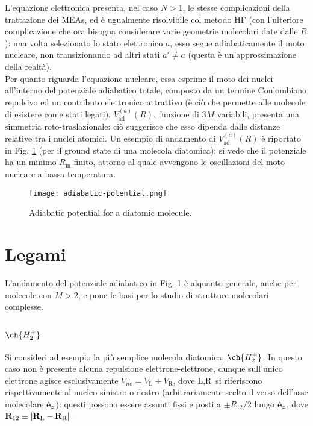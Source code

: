 L'equazione elettronica presenta, nel caso $ N > 1 $, le stesse complicazioni della trattazione dei MEAs, ed è ugualmente risolvibile col metodo HF (con l'ulteriore complicazione che ora bisogna considerare varie geometrie molecolari date dalle $ R $): una volta selezionato lo stato elettronico $ a $, esso segue adiabaticamente il moto nucleare, non transizionando ad altri stati $ a' \neq a $ (questa è un'approssimazione della realtà). \\
Per quanto riguarda l'equazione nucleare, essa esprime il moto dei nuclei all'interno del potenziale adiabatico totale, composto da un termine Coulombiano repulsivo ed un contributo elettronico attrattivo (è ciò che permette alle molecole di esistere come stati legati). $ V_\text{ad}^{(a)}(R) $, funzione di $ 3M $ variabili, presenta una simmetria roto-traslazionale: ciò suggerisce che esso dipenda dalle distanze relative tra i nuclei atomici. Un esempio di andamento di $ V_\text{ad}^{(a)}(R) $ è riportato in Fig. \ref{ad-pot} (per il ground state di una molecola diatomica): si vede che il potenziale ha un minimo $ R_\text{m} $ finito, attorno al quale avvengono le oscillazioni del moto nucleare a bassa temperatura.

\begin{figure}
	\centering
	\texttt{[image: adiabatic-potential.png]}
	\caption{Adiabatic potential for a diatomic molecule.}
	\label{ad-pot}
\end{figure}

\section{Legami}

L'andamento del potenziale adiabatico in Fig. \ref{ad-pot} è alquanto generale, anche per molecole con $ M > 2 $, e pone le basi per lo studio di strutture molecolari complesse.

\subsection{\texorpdfstring{$ \ch{H_2^+} $}{H2+}}

Si consideri ad esempio la più semplice molecola diatomica: $ \ch{H_2^+} $. In questo caso non è presente alcuna repulsione elettrone-elettrone, dunque sull'unico elettrone agisce esclusivamente $ V_{ne} = V_\text{L} + V_\text{R} $, dove $ \text{L},\text{R} $ si riferiscono rispettivamente al nucleo sinistro o destro (arbitrariamente scelto il verso dell'asse molecolare $ \hat{\mathbf{e}}_z $): questi possono essere assunti fissi e posti a $ \pm R_{12}/2 $ lungo $ \hat{\mathbf{e}}_z $, dove $ \mathbf{R}_{12} \equiv \left\lvert\mathbf{R}_\text{L} - \mathbf{R}_\text{R}\right\rvert $.

